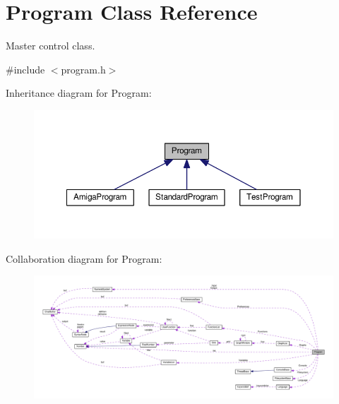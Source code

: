 \hypertarget{classProgram}{}\section{Program Class Reference}
\label{classProgram}


Master control class.  




{\ttfamily \#include $<$program.\+h$>$}



Inheritance diagram for Program\+:
\nopagebreak
\begin{figure}[H]
\begin{center}
\leavevmode
\includegraphics[width=350pt]{de/dca/classProgram__inherit__graph}
\end{center}
\end{figure}


Collaboration diagram for Program\+:
\nopagebreak
\begin{figure}[H]
\begin{center}
\leavevmode
\includegraphics[width=350pt]{d0/d48/classProgram__coll__graph}
\end{center}
\end{figure}
